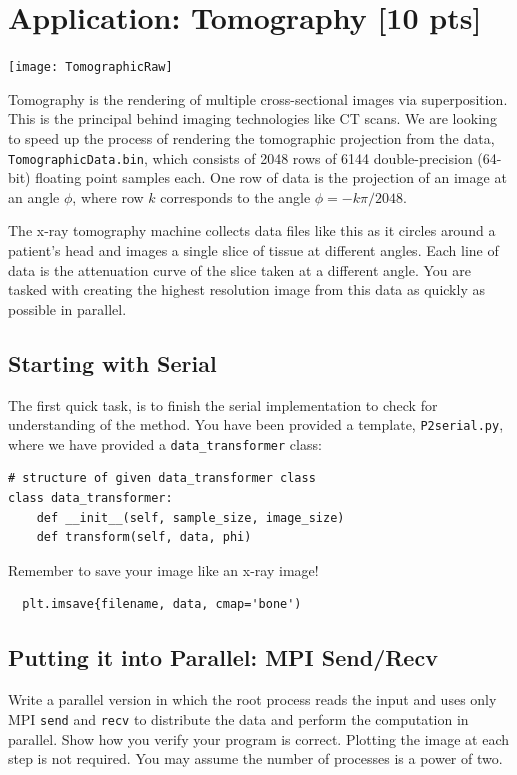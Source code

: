 \documentclass[12pt]{article}
\begin{document}
\pagebreak

\section{Application: Tomography [10 pts]}

\begin{center}
\texttt{[image: TomographicRaw]}
\end{center}

Tomography is the rendering of multiple cross-sectional images via superposition.  This is the principal behind imaging technologies like CT scans.  We are looking to speed up the process of rendering the tomographic projection from the data, \texttt{TomographicData.bin}, which consists of 2048 rows of 6144 double-precision (64-bit) floating point samples each.  One row of data is the projection of an image at an angle $\phi$, where row $k$ corresponds to the angle $\phi = -k\pi /2048$.

The x-ray tomography machine collects data files like this as it circles around a patient's head and images a single slice of tissue at different angles.  Each line of data is the attenuation curve of the slice taken at a different angle.  You are tasked with creating the highest resolution image from this data as quickly as possible in parallel.

\subsection*{Starting with Serial}
The first quick task, is to finish the serial implementation to check for understanding of the method.  You have been provided a template, \texttt{P2serial.py}, where we have provided a \texttt{data\_transformer} class:
\begin{lstlisting}
# structure of given data_transformer class
class data_transformer:
	def __init__(self, sample_size, image_size)
	def transform(self, data, phi)
\end{lstlisting}

Remember to save your image like an x-ray image!
\begin{lstlisting}
  plt.imsave{filename, data, cmap='bone')
\end{lstlisting}

\subsection*{Putting it into Parallel: MPI Send/Recv}
Write a parallel version in which the root process reads the input and uses only MPI \texttt{send} and \texttt{recv} to distribute the data and perform the computation in parallel.  Show how you verify your program is correct.  Plotting the image at each step is not required.  You may assume the number of processes is a power of two.
\end{document}
